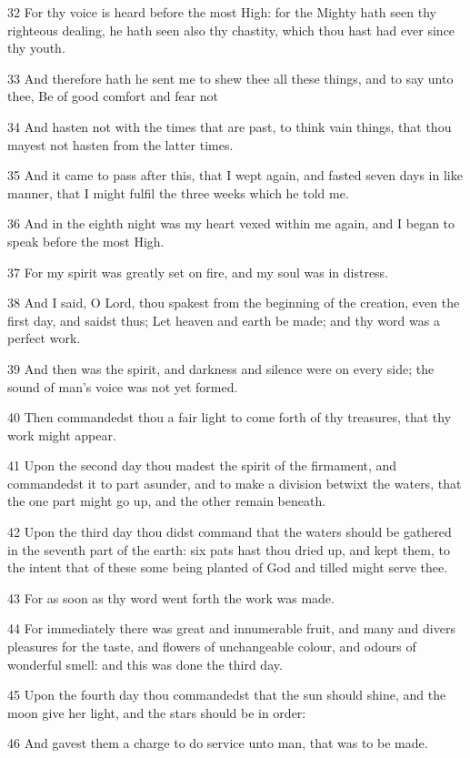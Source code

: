 \par 32 For thy voice is heard before the most High: for the Mighty hath seen thy righteous dealing, he hath seen also thy chastity, which thou hast had ever since thy youth.
\par 33 And therefore hath he sent me to shew thee all these things, and to say unto thee, Be of good comfort and fear not
\par 34 And hasten not with the times that are past, to think vain things, that thou mayest not hasten from the latter times.
\par 35 And it came to pass after this, that I wept again, and fasted seven days in like manner, that I might fulfil the three weeks which he told me.
\par 36 And in the eighth night was my heart vexed within me again, and I began to speak before the most High.
\par 37 For my spirit was greatly set on fire, and my soul was in distress.
\par 38 And I said, O Lord, thou spakest from the beginning of the creation, even the first day, and saidst thus; Let heaven and earth be made; and thy word was a perfect work.
\par 39 And then was the spirit, and darkness and silence were on every side; the sound of man's voice was not yet formed.
\par 40 Then commandedst thou a fair light to come forth of thy treasures, that thy work might appear.
\par 41 Upon the second day thou madest the spirit of the firmament, and commandedst it to part asunder, and to make a division betwixt the waters, that the one part might go up, and the other remain beneath.
\par 42 Upon the third day thou didst command that the waters should be gathered in the seventh part of the earth: six pats hast thou dried up, and kept them, to the intent that of these some being planted of God and tilled might serve thee.
\par 43 For as soon as thy word went forth the work was made.
\par 44 For immediately there was great and innumerable fruit, and many and divers pleasures for the taste, and flowers of unchangeable colour, and odours of wonderful smell: and this was done the third day.
\par 45 Upon the fourth day thou commandedst that the sun should shine, and the moon give her light, and the stars should be in order:
\par 46 And gavest them a charge to do service unto man, that was to be made.
